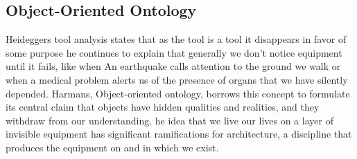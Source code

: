\subsection{Object-Oriented Ontology}
\label{subsec:ObjectOrientedOntology}
Heideggers tool analysis states that as the tool is a tool it disappears in favor of some purpose he continues to explain that generally we don't notice equipment until it fails, like when An earthquake calls attention to the ground we walk or when a medical problem alerts us of the presence of organs that we have silently depended\cite{Harman2011}.
Harmans, Object-oriented ontology, borrows this concept to formulate its central claim that objects have hidden qualities and realities, and they withdraw from our understanding.\cite{Gage2015}
he idea that we live our lives on a layer of invisible equipment has significant ramifications for architecture, a discipline that produces the equipment on and in which we exist.\cite{Gage2015}
